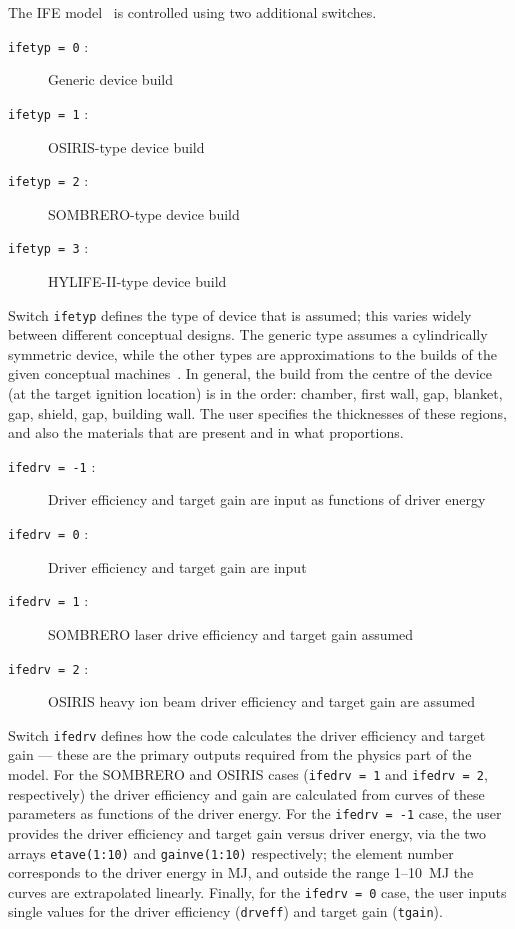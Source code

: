 \documentclass[11pt,a4paper]{report}
\begin{document}
The IFE model~\cite{process_ife} is controlled using two additional switches.
\begin{description}
\item [\texttt{ifetyp = 0} :] Generic device build
\item [\texttt{ifetyp = 1} :] OSIRIS-type device build~\cite{osiris1,osiris2,osiris3}
\item [\texttt{ifetyp = 2} :] SOMBRERO-type device build~\cite{sombrero1,sombrero2}
\item [\texttt{ifetyp = 3} :] HYLIFE-II-type device build~\cite{hylife1,hylife2,hylife3}
\end{description}
Switch \texttt{ifetyp} defines the type of device that is assumed; this varies
widely between different conceptual designs. The generic type assumes a
cylindrically symmetric device, while the other types are approximations to
the builds of the given conceptual machines~\cite{ife_build}. In general, the
build from the centre of the device (at the target ignition location) is in
the order: chamber, first wall, gap, blanket, gap, shield, gap, building
wall. The user specifies the thicknesses of these regions, and also the
materials that are present and in what proportions.%
\begin{description}
\item [\texttt{ifedrv = -1} :] Driver efficiency and target gain are input as
  functions of driver energy
\item [\texttt{ifedrv = 0} :] Driver efficiency and target gain are input
\item [\texttt{ifedrv = 1} :] SOMBRERO laser drive efficiency and target gain assumed
\item [\texttt{ifedrv = 2} :] OSIRIS heavy ion beam driver efficiency and
  target gain are assumed~\cite{ife_driver}
\end{description}
Switch \texttt{ifedrv} defines how the code calculates the driver efficiency
and target gain --- these are the primary outputs required from the physics
part of the model. For the SOMBRERO and OSIRIS cases (\texttt{ifedrv = 1} and
\texttt{ifedrv = 2}, respectively) the driver efficiency and gain are
calculated from curves of these parameters as functions of the driver
energy. For the \texttt{ifedrv = -1} case, the user provides the driver
efficiency and target gain versus driver energy, via the two arrays
\texttt{etave(1:10)} and \texttt{gainve(1:10)} respectively; the element number
corresponds to the driver energy in MJ, and outside the range 1--10~MJ the
curves are extrapolated linearly. Finally, for the \texttt{ifedrv = 0} case,
the user inputs single values for the driver efficiency (\texttt{drveff}) and
target gain (\texttt{tgain}).
\end{document}
